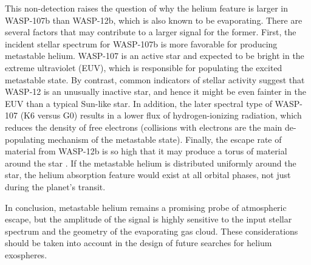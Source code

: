 \documentclass[RNAAS]{aastex62}
\begin{document}
This non-detection raises the question of why the helium feature is larger in  
WASP-107b than WASP-12b, which is also known to be evaporating.  There are several factors that may contribute to a
larger signal for the former. First, the incident stellar spectrum for WASP-107b
is more favorable for producing metastable helium.  WASP-107 is an active star
and expected to be bright in the extreme ultraviolet (EUV), which is responsible for populating the excited metastable
state. By contrast, common indicators of stellar activity suggest that WASP-12
is an unusually inactive star, and hence it might be even fainter in the EUV
than a typical Sun-like star.  In addition, the later spectral type of WASP-107 (K6 versus G0) results
in a lower flux of hydrogen-ionizing radiation, which reduces the density of
free electrons (collisions with electrons are the main de-populating mechanism
of the metastable state).  Finally, the escape rate of material from WASP-12b is
so high that it may produce a torus of material around the star
\citep{haswell17, debrecht18}. If the metastable helium is distributed uniformly
around the star, the helium absorption feature would exist at all orbital phases, not just during the planet's transit.


In conclusion, metastable helium remains a promising probe of atmospheric
escape, but the amplitude of the signal is highly sensitive to the input stellar
spectrum and the geometry of
the evaporating gas cloud.  These considerations should be taken into account in the design of future searches for helium exospheres.

 





\end{document}
